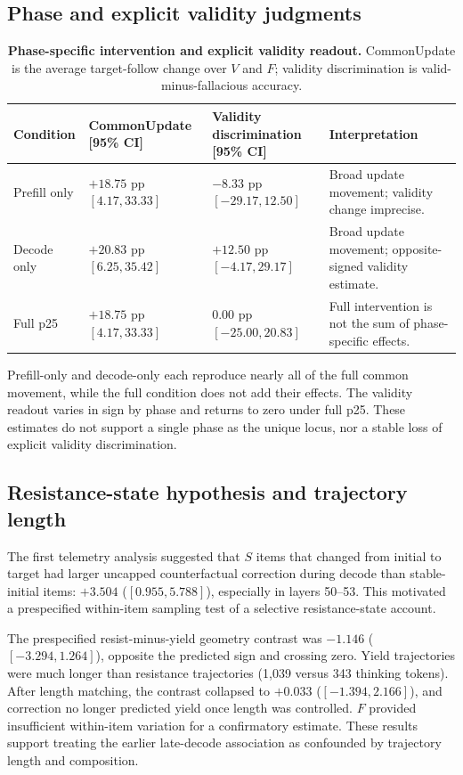 \documentclass[letterpaper]{article}
\begin{document}
\subsection{Phase and explicit validity judgments}

\begin{table}[t]
\centering
\small
\begin{tabular}{lL{4.0cm}L{4.0cm}L{4.0cm}}
\toprule
Condition & CommonUpdate [95\% CI] & Validity discrimination [95\% CI] & Interpretation \\
\midrule
Prefill only & $+18.75$ pp $[4.17,33.33]$ & $-8.33$ pp $[-29.17,12.50]$ & Broad update movement; validity change imprecise. \\
Decode only & $+20.83$ pp $[6.25,35.42]$ & $+12.50$ pp $[-4.17,29.17]$ & Broad update movement; opposite-signed validity estimate. \\
Full p25 & $+18.75$ pp $[4.17,33.33]$ & $0.00$ pp $[-25.00,20.83]$ & Full intervention is not the sum of phase-specific effects. \\
\bottomrule
\end{tabular}
\caption{\textbf{Phase-specific intervention and explicit validity readout.} CommonUpdate is the average target-follow change over $V$ and $F$; validity discrimination is valid-minus-fallacious accuracy.}
\label{tab:supp-phase}
\end{table}

Prefill-only and decode-only each reproduce nearly all of the full common movement, while the full condition does not add their effects.  The validity readout varies in sign by phase and returns to zero under full p25.  These estimates do not support a single phase as the unique locus, nor a stable loss of explicit validity discrimination.

\subsection{Resistance-state hypothesis and trajectory length}

The first telemetry analysis suggested that $S$ items that changed from initial to target had larger uncapped counterfactual correction during decode than stable-initial items: $+3.504$ ($[0.955,5.788]$), especially in layers 50--53.  This motivated a prespecified within-item sampling test of a selective resistance-state account.

The prespecified resist-minus-yield geometry contrast was $-1.146$ ($[-3.294,1.264]$), opposite the predicted sign and crossing zero.  Yield trajectories were much longer than resistance trajectories (1,039 versus 343 thinking tokens).  After length matching, the contrast collapsed to $+0.033$ ($[-1.394,2.166]$), and correction no longer predicted yield once length was controlled.  $F$ provided insufficient within-item variation for a confirmatory estimate.  These results support treating the earlier late-decode association as confounded by trajectory length and composition.
\end{document}
